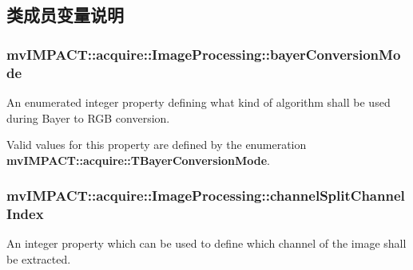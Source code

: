 \subsection{类成员变量说明}
\hypertarget{classmv_i_m_p_a_c_t_1_1acquire_1_1_image_processing_a33f1980b7ef1e3acbe3e0dd67f0ce6d3}{
\subsubsection[{bayer\+Conversion\+Mode}]{ mv\+I\+M\+P\+A\+C\+T\+::acquire\+::\+Image\+Processing\+::bayer\+Conversion\+Mode}}\label{classmv_i_m_p_a_c_t_1_1acquire_1_1_image_processing_a33f1980b7ef1e3acbe3e0dd67f0ce6d3}


An enumerated integer property defining what kind of algorithm shall be used during Bayer to R\+G\+B conversion. 

Valid values for this property are defined by the enumeration {\bfseries mv\+I\+M\+P\+A\+C\+T\+::acquire\+::\+T\+Bayer\+Conversion\+Mode}. \hypertarget{classmv_i_m_p_a_c_t_1_1acquire_1_1_image_processing_aefbc72fe4b938214fa4e8b1f7b709aca}{
\subsubsection[{channel\+Split\+Channel\+Index}]{ mv\+I\+M\+P\+A\+C\+T\+::acquire\+::\+Image\+Processing\+::channel\+Split\+Channel\+Index}}\label{classmv_i_m_p_a_c_t_1_1acquire_1_1_image_processing_aefbc72fe4b938214fa4e8b1f7b709aca}


An integer property which can be used to define which channel of the image shall be extracted. 

